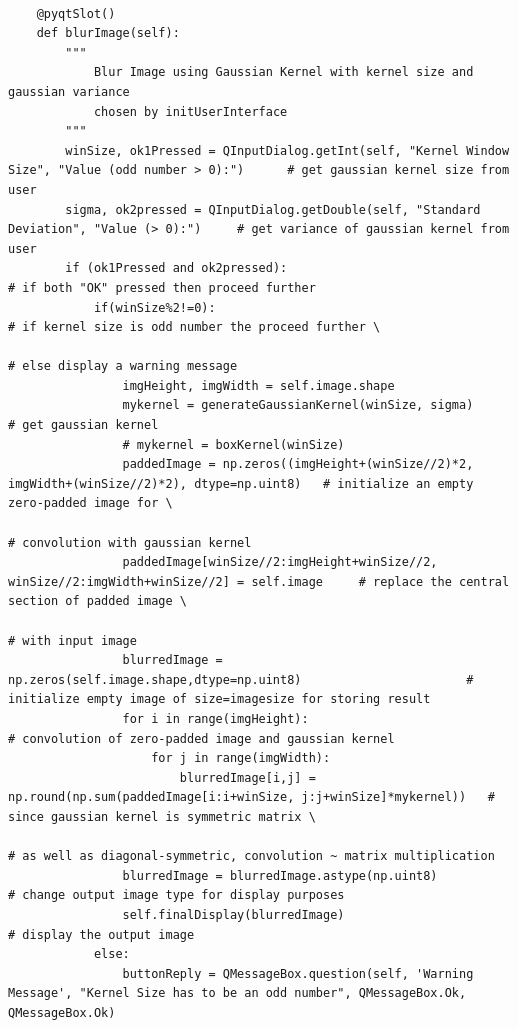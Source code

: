 \documentclass[letterpaper, 10 pt, conference]{ieeeconf}  %
\begin{document}
\begin{mdframed}
\begin{lstlisting}
    
    @pyqtSlot()
    def blurImage(self):
        """
            Blur Image using Gaussian Kernel with kernel size and gaussian variance
            chosen by initUserInterface
        """
        winSize, ok1Pressed = QInputDialog.getInt(self, "Kernel Window Size", "Value (odd number > 0):")      # get gaussian kernel size from user
        sigma, ok2pressed = QInputDialog.getDouble(self, "Standard Deviation", "Value (> 0):")     # get variance of gaussian kernel from user
        if (ok1Pressed and ok2pressed):                                                     # if both "OK" pressed then proceed further
            if(winSize%2!=0):                                                               # if kernel size is odd number the proceed further \
                                                                                            # else display a warning message
                imgHeight, imgWidth = self.image.shape
                mykernel = generateGaussianKernel(winSize, sigma)                           # get gaussian kernel
                # mykernel = boxKernel(winSize)
                paddedImage = np.zeros((imgHeight+(winSize//2)*2, imgWidth+(winSize//2)*2), dtype=np.uint8)   # initialize an empty zero-padded image for \
                                                                                            # convolution with gaussian kernel
                paddedImage[winSize//2:imgHeight+winSize//2, winSize//2:imgWidth+winSize//2] = self.image     # replace the central section of padded image \
                                                                                                         # with input image
                blurredImage = np.zeros(self.image.shape,dtype=np.uint8)                       # initialize empty image of size=imagesize for storing result
                for i in range(imgHeight):                                                     # convolution of zero-padded image and gaussian kernel
                    for j in range(imgWidth):
                        blurredImage[i,j] = np.round(np.sum(paddedImage[i:i+winSize, j:j+winSize]*mykernel))   # since gaussian kernel is symmetric matrix \
                                                                                        # as well as diagonal-symmetric, convolution ~ matrix multiplication
                blurredImage = blurredImage.astype(np.uint8)                            # change output image type for display purposes
                self.finalDisplay(blurredImage)                                         # display the output image
            else:
                buttonReply = QMessageBox.question(self, 'Warning Message', "Kernel Size has to be an odd number", QMessageBox.Ok, QMessageBox.Ok)


\end{lstlisting}
\end{mdframed}
\end{document}
